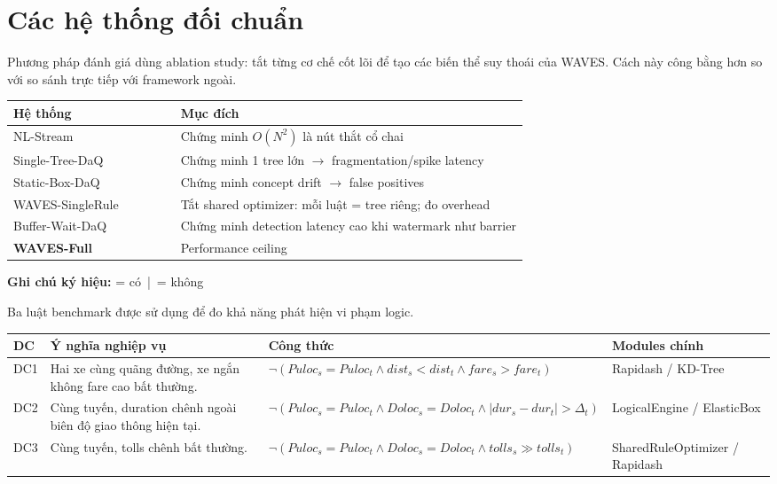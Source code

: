 \section{Các hệ thống đối chuẩn}

Phương pháp đánh giá dùng ablation study: tắt từng cơ chế cốt lõi để tạo các biến thể suy thoái của WAVES. Cách này công bằng hơn so với so sánh trực tiếp với framework ngoài.

{\small
\begin{longtable}{|L{0.18\textwidth}|c|c|c|c|L{0.30\textwidth}|}
\hline
\textbf{Hệ thống} &  &  &  &  & \textbf{Mục đích} \\
\hline
NL-Stream &  &  &  &  & Chứng minh $O(N^2)$ là nút thắt cổ chai \\
\hline
Single-Tree-DaQ &  &  &  &  & Chứng minh 1 tree lớn $\rightarrow$ fragmentation/spike latency \\
\hline
Static-Box-DaQ &  &  &  &  & Chứng minh concept drift $\rightarrow$ false positives \\
\hline
WAVES-SingleRule &  &  &  &  & Tắt shared optimizer: mỗi luật = tree riêng; đo overhead \\
\hline
Buffer-Wait-DaQ &  &  &  &  & Chứng minh detection latency cao khi watermark như barrier \\
\hline
\textbf{WAVES-Full} &  &  &  &  & Performance ceiling \\
\hline
\end{longtable}
}

\textbf{Ghi chú ký hiệu:}  = có \,|\,  = không

Ba luật benchmark được sử dụng để đo khả năng phát hiện vi phạm logic.

{\small
\begin{longtable}{|L{0.10\textwidth}|L{0.32\textwidth}|L{0.26\textwidth}|L{0.22\textwidth}|}
\hline
\textbf{DC} & \textbf{Ý nghĩa nghiệp vụ} & \textbf{Công thức} & \textbf{Modules chính} \\
\hline
DC1 & Hai xe cùng quãng đường, xe ngắn không fare cao bất thường. & $\neg(Puloc_s = Puloc_t \wedge dist_s < dist_t \wedge fare_s > fare_t)$ & Rapidash / KD-Tree \\
\hline
DC2 & Cùng tuyến, duration chênh ngoài biên độ giao thông hiện tại. & $\neg(Puloc_s = Puloc_t \wedge Doloc_s = Doloc_t \wedge |dur_s - dur_t| > \Delta_t)$ & LogicalEngine / ElasticBox \\
\hline
DC3 & Cùng tuyến, tolls chênh bất thường. & $\neg(Puloc_s = Puloc_t \wedge Doloc_s = Doloc_t \wedge tolls_s \gg tolls_t)$ & SharedRuleOptimizer / Rapidash \\
\hline
\end{longtable}
}

